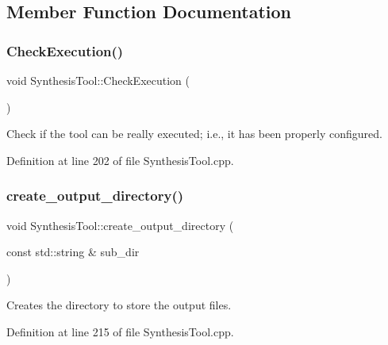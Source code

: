 \subsection{Member Function Documentation}
\mbox{\label{classSynthesisTool_ad71ab3aad818780236ad71942de30e47}} 
\subsubsection{\texorpdfstring{Check\+Execution()}{CheckExecution()}}
{\footnotesize\ttfamily void Synthesis\+Tool\+::\+Check\+Execution (\begin{DoxyParamCaption}{ }\end{DoxyParamCaption})\hspace{0.3cm}{\ttfamily [virtual]}}



Check if the tool can be really executed; i.\+e., it has been properly configured. 



Definition at line 202 of file Synthesis\+Tool.\+cpp.

\mbox{\label{classSynthesisTool_a759edbe8e0ce7d35f563196c4944ae9d}} 
\subsubsection{\texorpdfstring{create\+\_\+output\+\_\+directory()}{create\_output\_directory()}}
{\footnotesize\ttfamily void Synthesis\+Tool\+::create\+\_\+output\+\_\+directory (\begin{DoxyParamCaption}\item[{const std\+::string \&}]{sub\+\_\+dir }\end{DoxyParamCaption})\hspace{0.3cm}{\ttfamily [protected]}}



Creates the directory to store the output files. 



Definition at line 215 of file Synthesis\+Tool.\+cpp.



